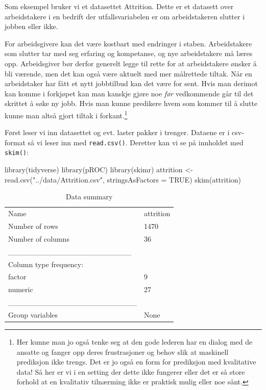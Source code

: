 \documentclass[
  letterpaper,
  DIV=11,
  numbers=noendperiod]{scrreprt}
\newenvironment{Shaded}{\begin{snugshade}}{\end{snugshade}}
\newcommand{\AttributeTok}[1]{\textcolor[rgb]{0.40,0.45,0.13}{#1}}
\newcommand{\ConstantTok}[1]{\textcolor[rgb]{0.56,0.35,0.01}{#1}}
\newcommand{\FunctionTok}[1]{\textcolor[rgb]{0.28,0.35,0.67}{#1}}
\newcommand{\NormalTok}[1]{\textcolor[rgb]{0.00,0.23,0.31}{#1}}
\newcommand{\OtherTok}[1]{\textcolor[rgb]{0.00,0.23,0.31}{#1}}
\newcommand{\StringTok}[1]{\textcolor[rgb]{0.13,0.47,0.30}{#1}}
\theoremstyle{definition}
\theoremstyle{remark}
\begin{document}
Som eksempel bruker vi et datasettet Attrition. Dette er et datasett
over arbeidstakere i en bedrift der utfallsvariabelen er om
arbeidstakeren slutter i jobben eller ikke.

For arbeidsgivere kan det være kostbart med endringer i staben.
Arbeidstakere som slutter tar med seg erfaring og kompetanse, og nye
arbeidstakere må læres opp. Arbeidsgiver bør derfor generelt legge til
rette for at arbeidstakere ønsker å bli værende, men det kan også være
aktuelt med mer målrettede tiltak. Når en arbeidstaker har fått et nytt
jobbtilbud kan det være for sent. Hvis man derimot kan komme i forkjøpet
kan man kanskje gjøre noe \emph{før} vedkommende går til det skrittet å
søke ny jobb. Hvis man kunne predikere hvem som kommer til å slutte
kunne man altså gjort tiltak i forkant.\footnote{Her kunne man jo også
  tenke seg at den gode lederen har en dialog med de ansatte og fanger
  opp deres frustrasjoner og behov slik at maskinell prediksjon ikke
  trengs. Det er jo også en form for prediksjon med kvalitative data! Så
  her er vi i en setting der dette ikke fungerer eller det er så store
  forhold at en kvalitativ tilnærming ikke er praktisk mulig eller noe
  sånt.}

Først leser vi inn datasettet og evt. laster pakker i trenger. Dataene
er i csv-format så vi leser inn med \texttt{read.csv()}. Deretter kan vi
se på innholdet med \texttt{skim()}:

\begin{Shaded}
\begin{Highlighting}[]
\FunctionTok{library}\NormalTok{(tidyverse) }
\FunctionTok{library}\NormalTok{(pROC) }
\FunctionTok{library}\NormalTok{(skimr)}
\NormalTok{attrition }\OtherTok{\textless{}{-}}\FunctionTok{read.csv}\NormalTok{(}\StringTok{"../data/Attrition.csv"}\NormalTok{, }\AttributeTok{stringsAsFactors =} \ConstantTok{TRUE}\NormalTok{)  }
\FunctionTok{skim}\NormalTok{(attrition)  }
\end{Highlighting}
\end{Shaded}

\begin{longtable}[]{@{}ll@{}}
\caption{Data summary}\tabularnewline
\toprule()
\endhead
Name & attrition \\
Number of rows & 1470 \\
Number of columns & 36 \\
\_\_\_\_\_\_\_\_\_\_\_\_\_\_\_\_\_\_\_\_\_\_\_ & \\
Column type frequency: & \\
factor & 9 \\
numeric & 27 \\
\_\_\_\_\_\_\_\_\_\_\_\_\_\_\_\_\_\_\_\_\_\_\_\_ & \\
Group variables & None \\
\bottomrule()
\end{longtable}
\end{document}
